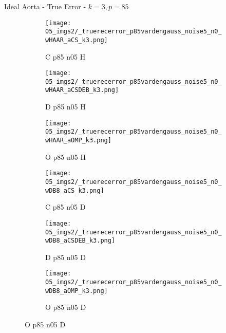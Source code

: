 \begin{frame}{Ideal Aorta - True Error - $k=3,p=85$}{}
\begin{figure}
\begin{subfigure}{0.13\textwidth}
\texttt{[image: 05\_imgs2/\_truerecerror\_p85vardengauss\_noise5\_n0\_wHAAR\_aCS\_k3.png]}
\caption*{\tiny C p85 n05 H}
\end{subfigure}
\begin{subfigure}{0.13\textwidth}
\texttt{[image: 05\_imgs2/\_truerecerror\_p85vardengauss\_noise5\_n0\_wHAAR\_aCSDEB\_k3.png]}
\caption*{\tiny D p85 n05 H}
\end{subfigure}
\begin{subfigure}{0.13\textwidth}
\texttt{[image: 05\_imgs2/\_truerecerror\_p85vardengauss\_noise5\_n0\_wHAAR\_aOMP\_k3.png]}
\caption*{\tiny O p85 n05 H}
\end{subfigure}
\begin{subfigure}{0.13\textwidth}
\texttt{[image: 05\_imgs2/\_truerecerror\_p85vardengauss\_noise5\_n0\_wDB8\_aCS\_k3.png]}
\caption*{\tiny C p85 n05 D}
\end{subfigure}
\begin{subfigure}{0.13\textwidth}
\texttt{[image: 05\_imgs2/\_truerecerror\_p85vardengauss\_noise5\_n0\_wDB8\_aCSDEB\_k3.png]}
\caption*{\tiny D p85 n05 D}
\end{subfigure}
\begin{subfigure}{0.13\textwidth}
\texttt{[image: 05\_imgs2/\_truerecerror\_p85vardengauss\_noise5\_n0\_wDB8\_aOMP\_k3.png]}
\caption*{\tiny O p85 n05 D}
\end{subfigure}

\vspace{5pt}


\end{figure}
\end{frame}
